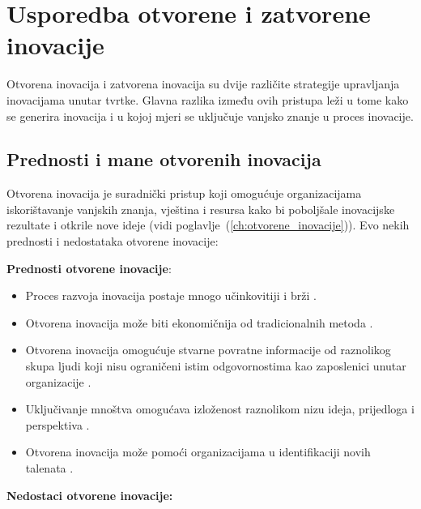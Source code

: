 \chapter{Usporedba otvorene i zatvorene inovacije} \label{ch:usporedba_otvorene_i_zatvorene_inovacije}

Otvorena inovacija i zatvorena inovacija su dvije različite strategije
upravljanja inovacijama unutar tvrtke. Glavna razlika između ovih pristupa leži
u tome kako se generira inovacija i u kojoj mjeri se uključuje vanjsko znanje u
proces inovacije.

\section{Prednosti i mane otvorenih inovacija} \label{sec:prednosti_i_mane_otvorenih_inovacija}

Otvorena inovacija je suradnički pristup koji omogućuje organizacijama
iskorištavanje vanjskih znanja, vještina i resursa kako bi poboljšale
inovacijske rezultate i otkrile nove ideje (vidi
poglavlje~(\ref{ch:otvorene_inovacije})). Evo nekih prednosti i nedostataka
otvorene inovacije:

\textbf{Prednosti otvorene inovacije}:

\begin{itemize}
\item Proces razvoja inovacija postaje mnogo učinkovitiji i brži \citep{gotechinnovationcompare2021}.
\item Otvorena inovacija može biti ekonomičnija od tradicionalnih metoda \citep{a2dopeninnovation2023}.
\item Otvorena inovacija omogućuje stvarne povratne informacije od raznolikog
skupa ljudi koji nisu ograničeni istim odgovornostima kao zaposlenici unutar
organizacije \citep{a2dopeninnovation2023}.
\item Uključivanje mnoštva omogućava izloženost raznolikom nizu ideja,
prijedloga i perspektiva \citep{a2dopeninnovation2023}.
\item Otvorena inovacija može pomoći organizacijama u identifikaciji novih
talenata \citep{a2dopeninnovation2023}.
\end{itemize}

\textbf{Nedostaci otvorene inovacije:}

